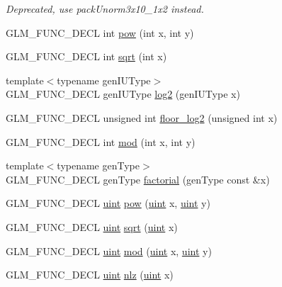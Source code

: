 \begin{CompactItemize}
\begin{CompactList}\small\item\em Deprecated, use packUnorm3x10\_\-1x2 instead. \item\end{CompactList}\item 
GLM\_\-FUNC\_\-DECL int \hyperlink{group__gtx__integer_g9642514a44a67afa70966d756f040ca9}{pow} (int x, int y)
\item 
GLM\_\-FUNC\_\-DECL int \hyperlink{group__gtx__integer_g78e2e68330e91d350fcfc2f4831cad12}{sqrt} (int x)
\item 
{\footnotesize template$<$typename genIUType$>$ }\\GLM\_\-FUNC\_\-DECL genIUType \hyperlink{group__gtx__integer_g43dcff81ada0f7d4a29b25ca2a0cef2f}{log2} (genIUType x)
\item 
GLM\_\-FUNC\_\-DECL unsigned int \hyperlink{group__gtx__integer_g7011b4e1c1e1ed492149b028feacc00e}{floor\_\-log2} (unsigned int x)
\item 
GLM\_\-FUNC\_\-DECL int \hyperlink{group__gtx__integer_gb9d22df91aac4d9eb925a4910f556f1b}{mod} (int x, int y)
\item 
{\footnotesize template$<$typename genType$>$ }\\GLM\_\-FUNC\_\-DECL genType \hyperlink{group__gtx__integer_g57ba2a6a2729f23ba4848bbad551dcd1}{factorial} (genType const \&x)
\item 
GLM\_\-FUNC\_\-DECL \hyperlink{group__core__precision_g4fd29415871152bfb5abd588334147c8}{uint} \hyperlink{group__gtx__integer_ga8229e850c3cc4ad83492fe390ada044}{pow} (\hyperlink{group__core__precision_g4fd29415871152bfb5abd588334147c8}{uint} x, \hyperlink{group__core__precision_g4fd29415871152bfb5abd588334147c8}{uint} y)
\item 
GLM\_\-FUNC\_\-DECL \hyperlink{group__core__precision_g4fd29415871152bfb5abd588334147c8}{uint} \hyperlink{group__gtx__integer_g457e9efca8339bf918d319e9c55f7c8f}{sqrt} (\hyperlink{group__core__precision_g4fd29415871152bfb5abd588334147c8}{uint} x)
\item 
GLM\_\-FUNC\_\-DECL \hyperlink{group__core__precision_g4fd29415871152bfb5abd588334147c8}{uint} \hyperlink{group__gtx__integer_gb8f9ec0ca93ca90669434224818f0750}{mod} (\hyperlink{group__core__precision_g4fd29415871152bfb5abd588334147c8}{uint} x, \hyperlink{group__core__precision_g4fd29415871152bfb5abd588334147c8}{uint} y)
\item 
GLM\_\-FUNC\_\-DECL \hyperlink{group__core__precision_g4fd29415871152bfb5abd588334147c8}{uint} \hyperlink{group__gtx__integer_gcbe62fd2384464c16ea30ecc4defc11c}{nlz} (\hyperlink{group__core__precision_g4fd29415871152bfb5abd588334147c8}{uint} x)

\end{CompactItemize}
